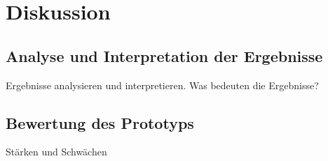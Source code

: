 \chapter{Diskussion}

\section{Analyse und Interpretation der Ergebnisse}

Ergebnisse analysieren und interpretieren.
Was bedeuten die Ergebnisse?

\section{Bewertung des Prototyps}

Stärken und Schwächen
